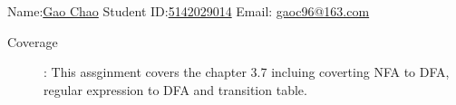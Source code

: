 \documentclass[12pt,a4paper]{article}
\begin{document}
\noindent

\noindent{}
\begin{center}
\footnotesize{\color{blue} \quad Name:\underline {Gao Chao}  \quad Student ID:\underline {5142029014} \quad Email: \underline {gaoc96@163.com} }
\end{center}

\begin{description}
	\item[Coverage]: This assginment covers the chapter 3.7 incluing coverting NFA to DFA, regular expression to DFA and transition table.
\end{description}
\end{document}
